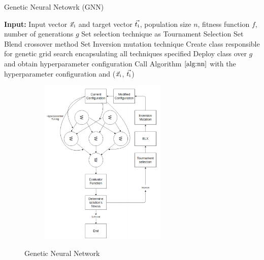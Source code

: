 \documentclass[conference]{IEEEtran}
\theoremstyle{definition}
\begin{document}
\begin{algorithm}[t]
\scriptsize
\caption{Genetic Neural Netowrk (GNN)}
\label{alg:gnn}
\begin{algorithmic}[1]
\STATE \textbf{Input:} Input vector $\vec{x}\textsubscript{i}$ and target vector $\vec{t\textsubscript{i}}$, population size $\textit{n}$, fitness function $\textit{f}$, number of generations $\textit{g}$
\STATE Set selection technique as Tournament Selection
\STATE Set Blend crossover method 
\STATE Set Inversion mutation technique
\ENDFOR
\STATE Create class responsible for genetic grid search encapsulating all techniques specified
\STATE Deploy class over $\textit{g}$ and obtain hyperparameter configuration   
\STATE Call Algorithm $\ref{alg:nn}$ with the hyperparameter configuration and ($\vec{x}\textsubscript{i}$, $\vec{t\textsubscript{i}}$)
\end{algorithmic}
\end{algorithm}

\begin{figure}
\centering
\begin{subfigure}{5cm}
\centering\includegraphics[height=8cm]{nn.png}
\end{subfigure}%
\caption{Genetic Neural Network}
\label{fgn}
\end{figure}
\end{document}
